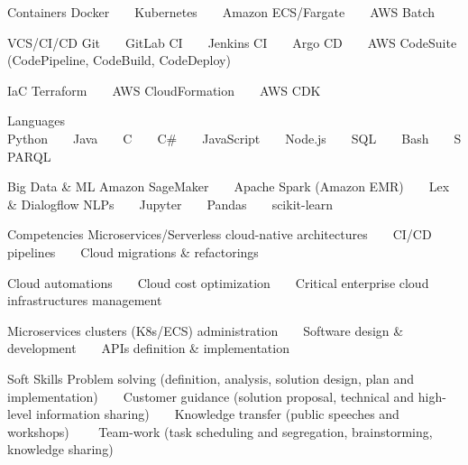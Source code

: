 

\begin{cvskills}

\cvskill
{Containers} %
{Docker~~\textbullet~~Kubernetes~~\textbullet~~Amazon ECS/Fargate~~\textbullet~~AWS Batch} %


\cvskill
{VCS/CI/CD}%
{Git~~\textbullet~~GitLab CI~~\textbullet~~Jenkins CI~~\textbullet~~Argo CD~~\textbullet~~AWS CodeSuite (CodePipeline, CodeBuild, CodeDeploy)} %


\cvskill
{IaC} %
{Terraform~~\textbullet~~AWS CloudFormation~~\textbullet~~AWS CDK} %


  \cvskill
    {Languages} %
    {Python~~\textbullet~~Java~~\textbullet~~C~~\textbullet~~C\#~~\textbullet~~JavaScript~~\textbullet~~Node.js~~\textbullet~~SQL~~\textbullet~~Bash~~\textbullet~~SPARQL} %

\cvskill
{Big Data \& ML} %
{Amazon SageMaker~~\textbullet~~Apache Spark (Amazon EMR)~~\textbullet~~Lex \& Dialogflow NLPs~~\textbullet~~Jupyter~~\textbullet~~Pandas~~\textbullet~~scikit-learn} %

  \cvskill
{Competencies} %
{Microservices/Serverless cloud-native architectures~~\textbullet~~CI/CD pipelines~~\textbullet~~Cloud migrations \& refactorings~~\textbullet~~}

  \cvskill
  {}
  {Cloud automations~~\textbullet~~Cloud cost optimization~~\textbullet~~Critical enterprise cloud infrastructures management~~\textbullet~~} %

  \cvskill
{} %
{Microservices clusters (K8s/ECS) administration~~\textbullet~~Software design \& development~~\textbullet~~APIs definition \& implementation} %
    
    
  \cvskill
{Soft Skills} %
{Problem solving (definition, analysis, solution design, plan and implementation)~~\textbullet~~Customer guidance (solution }
  \cvskill
{} %
  {proposal, technical and high-level information sharing)~~\textbullet~~Knowledge transfer (public speeches and workshops)~~\textbullet~~}
\cvskill
{}
{Team-work (task scheduling and segregation, brainstorming, knowledge sharing)} %

\end{cvskills}

